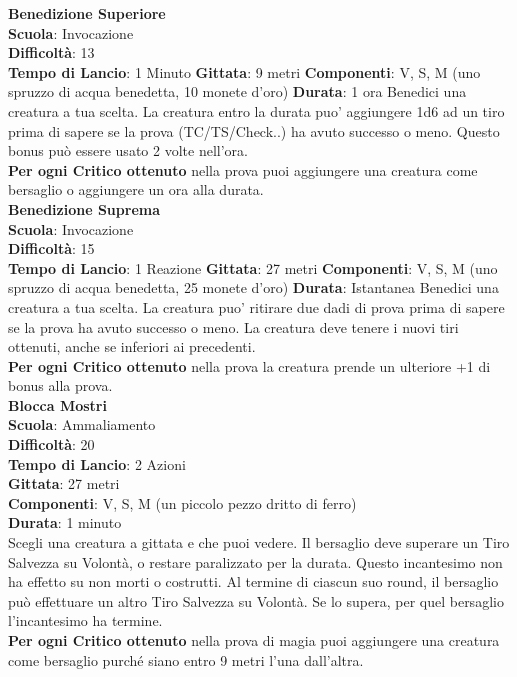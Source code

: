 \begin{multicols}{2}
\medskip\textbf{Benedizione Superiore}\\
\textbf{Scuola}: Invocazione\\
\textbf{Difficoltà}:  13\\
\textbf{Tempo di Lancio}: 1 Minuto
\textbf{Gittata}: 9 metri
\textbf{Componenti}: V, S, M (uno spruzzo di acqua benedetta, 10 monete d'oro)
\textbf{Durata}: 1 ora
Benedici una creatura a tua scelta. La creatura entro la durata puo' aggiungere 1d6 ad un tiro prima di sapere se la prova (TC/TS/Check..) ha avuto successo o meno. Questo bonus può essere usato 2 volte nell'ora.\\
\textbf{Per ogni Critico ottenuto} nella prova puoi aggiungere una creatura come bersaglio o aggiungere un ora alla durata.\\

\medskip\textbf{Benedizione Suprema}\\
\textbf{Scuola}: Invocazione\\
\textbf{Difficoltà}:  15\\
\textbf{Tempo di Lancio}: 1 Reazione
\textbf{Gittata}: 27 metri
\textbf{Componenti}: V, S, M (uno spruzzo di acqua benedetta, 25 monete d'oro)
\textbf{Durata}: Istantanea
Benedici una creatura a tua scelta. La creatura puo' ritirare due dadi di prova prima di sapere se la prova ha avuto successo o meno. La creatura deve tenere i nuovi tiri ottenuti, anche se inferiori ai precedenti.\\
\textbf{Per ogni Critico ottenuto} nella prova la creatura prende un ulteriore +1 di bonus alla prova.\\

\medskip\textbf{Blocca Mostri}\\
\textbf{Scuola}: Ammaliamento\\
\textbf{Difficoltà}:  20\\
\textbf{Tempo di Lancio}: 2 Azioni\\
\textbf{Gittata}: 27 metri\\
\textbf{Componenti}: V, S, M (un piccolo pezzo dritto di ferro)\\
\textbf{Durata}: 1 minuto\\
Scegli una creatura a gittata e che puoi vedere. Il bersaglio deve superare un Tiro Salvezza su Volontà, o restare paralizzato per la durata. Questo incantesimo non ha effetto su non morti o costrutti. Al termine di ciascun suo round, il bersaglio può effettuare un altro Tiro Salvezza su Volontà. Se lo supera, per quel bersaglio l'incantesimo ha termine.\\
\textbf{Per ogni Critico ottenuto} nella prova di magia puoi aggiungere una creatura come bersaglio purché siano entro 9 metri l’una dall'altra.



\end{multicols}
